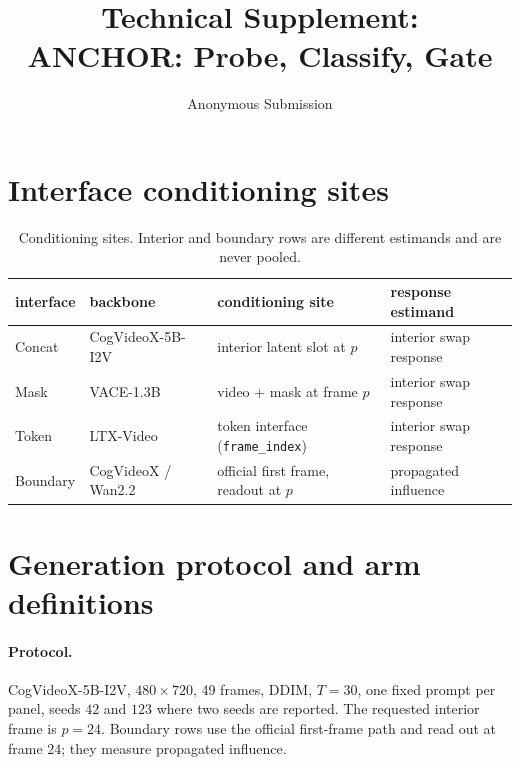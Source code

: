 \documentclass[letterpaper]{article}
\title{Technical Supplement:\\
ANCHOR: Probe, Classify, Gate}
\author{Anonymous Submission}
\begin{document}
\maketitle
\appendix

\section{Interface conditioning sites}
\label{sec:supp-sites}

\begin{table}[h]\centering\small
\begin{tabular}{@{}llll@{}}
\toprule
interface & backbone & conditioning site & response estimand\\
\midrule
Concat & CogVideoX-5B-I2V & interior latent slot at $p$ & interior swap response\\
Mask & VACE-1.3B & video + mask at frame $p$ & interior swap response\\
Token & LTX-Video & token interface (\texttt{frame\_index}) & interior swap response\\
Boundary & CogVideoX / Wan2.2 & official first frame, readout at $p$ & propagated influence\\
\bottomrule
\end{tabular}
\caption{Conditioning sites. Interior and boundary rows are different
estimands and are never pooled.}
\end{table}

\section{Generation protocol and arm definitions}

\paragraph{Protocol.} CogVideoX-5B-I2V, $480{\times}720$, 49 frames,
DDIM, $T{=}30$, one fixed prompt per panel, seeds $42$ and $123$ where
two seeds are reported. The requested interior frame is $p{=}24$.
Boundary rows use the official first-frame path and read out at frame
$24$; they measure propagated influence.
\end{document}
